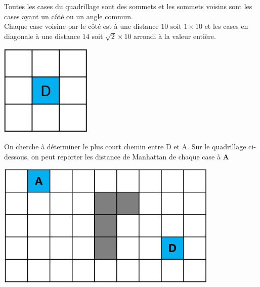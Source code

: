 \begin{minipage}[c]{.65\linewidth}
Toutes les cases du quadrillage sont des sommets et les sommets voisins sont les cases ayant un côté ou un angle commun.\\
Chaque case voisine par le côté est à une distance $10$ soit $1 \times 10$ et les cases en diagonale à une distance $14$ soit $\sqrt{2} \times 10$ arrondi à la valeur entière.\\
\end{minipage}
\hfill %
\begin{minipage}[c]{.35\linewidth}
\begin{center}
\includegraphics[scale=0.7]{images/quadri1.jpg}
\end{center}
\end{minipage}


On cherche à déterminer le plus court chemin entre D et A. Sur le quadrillage ci-dessous, on peut reporter les distance de Manhattan de chaque case à \textbf{A}
\begin{center}
\includegraphics[scale=0.8]{images/quadri2.jpg}
\end{center}

